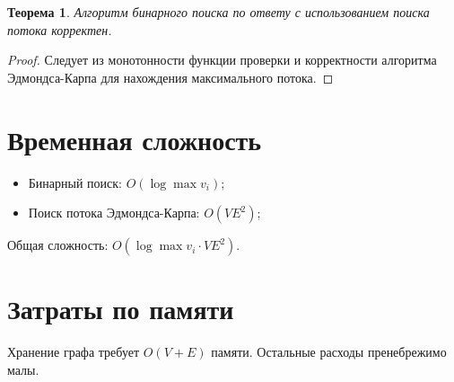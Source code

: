 \documentclass{article}
\newtheorem{theorem}{Теорема}  %
\begin{document}
\begin{theorem}
    Алгоритм бинарного поиска по ответу с использованием поиска потока корректен.
\end{theorem}

\begin{proof}
    Следует из монотонности функции проверки и корректности алгоритма Эдмондса-Карпа для нахождения максимального потока.
\end{proof}

\section{Временная сложность}

\begin{itemize}
    \item Бинарный поиск: $O(\log \max{v_i})$;
    \item Поиск потока Эдмондса-Карпа: $O(VE^2)$;
\end{itemize}

Общая сложность: $O(\log \max{v_i} \cdot VE^2)$.

\section{Затраты по памяти}

Хранение графа требует $O(V + E)$ памяти. Остальные расходы пренебрежимо малы.
\end{document}
